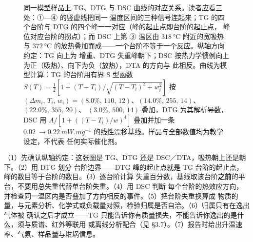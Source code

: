 \begin{figure}[tbp]
\caption{同一模型样品上 TG、DTG 与 DSC 曲线的对应关系。读者应看三处：①—④ 的竖虚线把同一
温度区间的三种信号连起来；TG 的四个台阶与 DTG 的四个峰一一对应（峰的起止点即台阶的起止点，
峰位对应台阶的拐点）；而 DSC 上第 ③ 温区由 $\qty{318}{\celsius}$ 附近的宽吸热与
$\qty{372}{\celsius}$ 的放热叠加而成——一个台阶不等于一个反应。纵轴方向约定：TG 向上为
增重、DTG 失重峰朝下；DSC 按热力学惯例向上为正（吸热）、向下为负（放热），DTA 的方向与
此相反。曲线为模型计算：TG 的台阶用有界 S 型函数
$S(T)=\frac{1}{2}\left[1+(T-T_i)/\sqrt{(T-T_i)^2+w_i^2}\right]$ 按
$(\Delta m_i,\,T_i,\,w_i)=(8.0\%,\,110,\,12)$、$(14.0\%,\,255,\,14)$、$(22.0\%,\,355,\,20)$、
$(3.0\%,\,500,\,14)$ 叠加，DTG 为其解析导数，DSC 用 $A/[1+((T-T_i)/w)^4]$ 叠加并加一条
$\qty{0.02}{}\to\qty{0.22}{mW.mg^{-1}}$ 的线性漂移基线。样品与全部数值均为教学设定，不代表
任何实际催化剂。\modelmark{}}
\label{fig:ch03-tgdsc}
\end{figure}

\begin{dataflow}
（1）先确认纵轴约定：这张图是 TG、DTG 还是 DSC／DTA，吸热朝上还是朝下。（2）用 DTG 划分
台阶边界——DTG 峰的起止点就是 TG 台阶的起止点，峰的数目等于台阶的数目。（3）逐台阶计算
失重百分数，基线取该台阶\textbf{之前}的平台，不要用总失重代替单台阶失重。（4）用 DSC 判断
每个台阶的热效应方向，并检查同一温区内是否叠加了方向相反的事件。（5）把台阶失重换算成
物质的量，与元素分析、化学式或负载量对照，检验归属是否自洽。（6）归属只有在逸出气体被
确认之后才成立——TG 只能告诉你有质量损失，不能告诉你逸出的是什么，须与质谱、红外等联用
或离线分析配合（见 §3.7）。（7）报告时给出升温速率、气氛、样品量与坩埚信息。
\end{dataflow}

